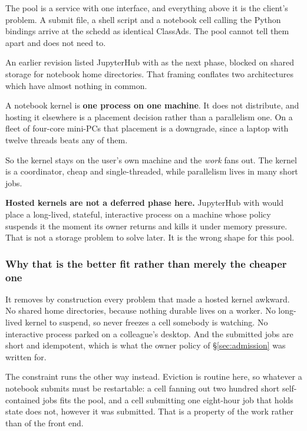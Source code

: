 \begin{keypoint}
The pool is a service with one interface, and everything above it is the
client's problem. A submit file, a shell script and a notebook cell calling the
Python bindings arrive at the schedd as identical ClassAds. The pool cannot
tell them apart and does not need to.
\end{keypoint}

An earlier revision listed JupyterHub with  as the next phase,
blocked on shared storage for notebook home directories. That framing conflates
two architectures which have almost nothing in common.

A notebook kernel is \textbf{one process on one machine}. It does not
distribute, and hosting it elsewhere is a placement decision rather than a
parallelism one. On a fleet of four-core mini-PCs that placement is a downgrade,
since a laptop with twelve threads beats any of them.

So the kernel stays on the user's own machine and the \emph{work} fans out. The
kernel is a coordinator, cheap and single-threaded, while parallelism lives in
many short jobs.

\begin{keypoint}
\textbf{Hosted kernels are not a deferred phase here.} JupyterHub with
 would place a long-lived, stateful, interactive process on a
machine whose policy suspends it the moment its owner returns and kills it under
memory pressure. That is not a storage problem to solve later. It is the wrong
shape for this pool.
\end{keypoint}

\subsubsection{Why that is the better fit rather than merely the cheaper one}

It removes by construction every problem that made a hosted kernel awkward. No
shared home directories, because nothing durable lives on a worker. No
long-lived kernel to suspend, so  never freezes a cell somebody is
watching. No interactive process parked on a colleague's desktop. And the
submitted jobs are short and idempotent, which is what the owner policy of
\S\ref{sec:admission} was written for.

The constraint runs the other way instead. Eviction is routine here, so whatever
a notebook submits must be restartable: a cell fanning out two hundred short
self-contained jobs fits the pool, and a cell submitting one eight-hour job that
holds state does not, however it was submitted. That is a property of the work
rather than of the front end.

